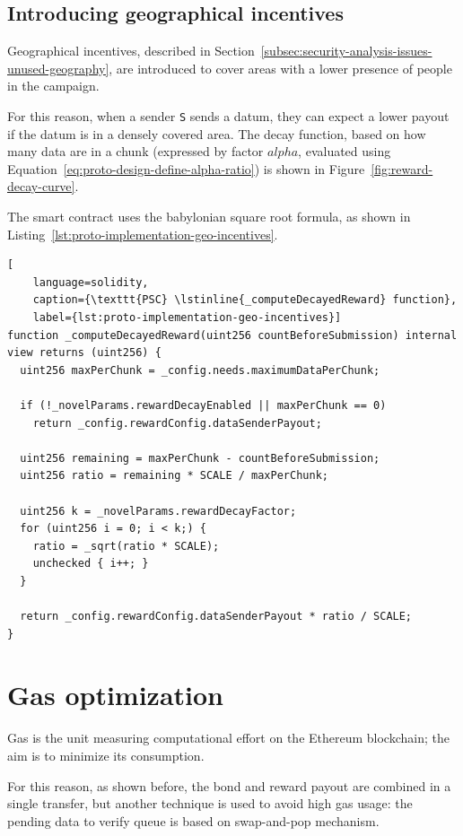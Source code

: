 \subsection{Introducing geographical incentives}\label{subsec:extended-protocol-introducing-geographical-incentives}
Geographical incentives, described in Section~\ref{subsec:security-analysis-issues-unused-geography}, are introduced to cover areas with a lower presence of people in the campaign.

For this reason, when a sender \texttt{S} sends a datum, they can expect a lower payout if the datum is in a densely covered area.
The decay function, based on how many data are in a chunk (expressed by factor $alpha$, evaluated using Equation~\ref{eq:proto-design-define-alpha-ratio}) is shown in Figure~\ref{fig:reward-decay-curve}.

The smart contract uses the babylonian square root formula, as shown in Listing~\ref{lst:proto-implementation-geo-incentives}.
\begin{lstlisting}[
    language=solidity,
    caption={\texttt{PSC} \lstinline{_computeDecayedReward} function},
    label={lst:proto-implementation-geo-incentives}]
function _computeDecayedReward(uint256 countBeforeSubmission) internal view returns (uint256) {
  uint256 maxPerChunk = _config.needs.maximumDataPerChunk;

  if (!_novelParams.rewardDecayEnabled || maxPerChunk == 0)
    return _config.rewardConfig.dataSenderPayout;

  uint256 remaining = maxPerChunk - countBeforeSubmission;
  uint256 ratio = remaining * SCALE / maxPerChunk;

  uint256 k = _novelParams.rewardDecayFactor;
  for (uint256 i = 0; i < k;) {
    ratio = _sqrt(ratio * SCALE);
    unchecked { i++; }
  }

  return _config.rewardConfig.dataSenderPayout * ratio / SCALE;
}
\end{lstlisting}

\section{Gas optimization}\label{sec:implementation-gas-optimization}
Gas is the unit measuring computational effort on the Ethereum blockchain; the aim is to minimize its consumption.

For this reason, as shown before, the bond and reward payout are combined in a single transfer, but another technique is used to avoid high gas usage: the pending data to verify queue is based on swap-and-pop mechanism.

